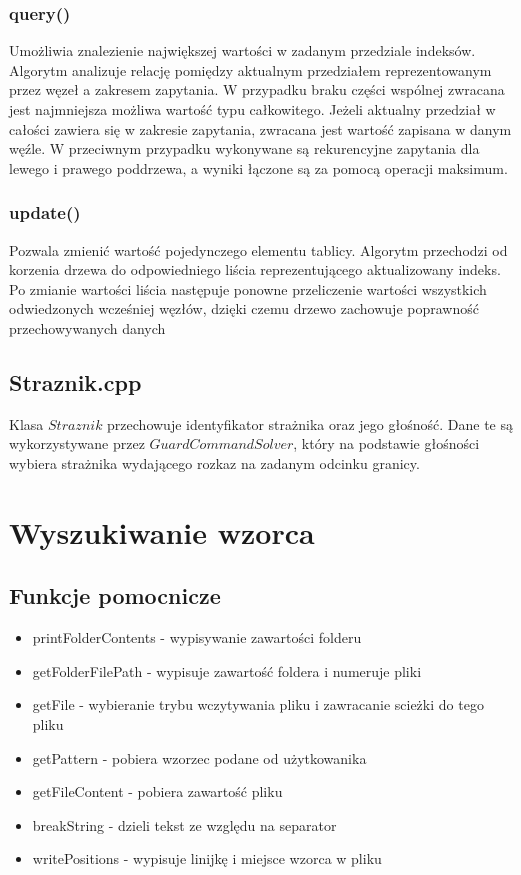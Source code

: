 \documentclass{article}
\begin{document}
\subsubsection{query()}
Umożliwia znalezienie największej wartości w zadanym przedziale indeksów. Algorytm analizuje relację pomiędzy aktualnym przedziałem reprezentowanym przez węzeł a zakresem zapytania. W przypadku braku części wspólnej zwracana jest najmniejsza możliwa wartość typu całkowitego. Jeżeli aktualny przedział w całości zawiera się w zakresie zapytania, zwracana jest wartość zapisana w danym węźle. W przeciwnym przypadku wykonywane są rekurencyjne zapytania dla lewego i prawego poddrzewa, a wyniki łączone są za pomocą operacji maksimum. 
\subsubsection{update()}
Pozwala zmienić wartość pojedynczego elementu tablicy. Algorytm przechodzi od korzenia drzewa do odpowiedniego liścia reprezentującego aktualizowany indeks. Po zmianie wartości liścia następuje ponowne przeliczenie wartości wszystkich odwiedzonych wcześniej węzłów, dzięki czemu drzewo zachowuje poprawność przechowywanych danych



\subsection{Straznik.cpp}
Klasa $Straznik$ przechowuje identyfikator strażnika oraz jego głośność. Dane te są wykorzystywane przez $GuardCommandSolver$, który na podstawie głośności wybiera strażnika wydającego rozkaz na zadanym odcinku granicy.




\section{Wyszukiwanie wzorca}
\subsection{Funkcje pomocnicze}
\begin{itemize}
    \item printFolderContents - wypisywanie zawartości folderu
    \item getFolderFilePath - wypisuje zawartość foldera i numeruje pliki
    \item getFile - wybieranie trybu wczytywania pliku i zawracanie scieżki do tego pliku
    \item getPattern - pobiera wzorzec podane od użytkowanika
    \item getFileContent - pobiera zawartość pliku
    \item breakString - dzieli tekst ze względu na separator
    \item writePositions - wypisuje linijkę i miejsce wzorca w pliku
\end{itemize}
\end{document}
